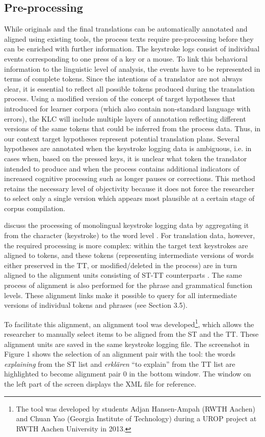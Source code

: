 \documentclass[output=paper]{LSP/langsci}
\begin{document}
\subsection{Pre-processing}
While originals and the final translations can be automatically annotated and aligned using existing tools, the process texts require pre-processing before they can be enriched with further information. The keystroke logs consist of individual events corresponding to one press of a key or a mouse. To link this behavioral information to the linguistic level of analysis, the events have to be represented in terms of complete tokens. Since the intentions of a translator are not always clear, it is essential to reflect all possible tokens produced during the translation process. Using a modified version of the concept of target hypotheses that \citet{Lüdeling2008} introduced for learner corpora (which also contain non-standard language with errors), the KLC will include multiple layers of annotation reflecting different versions of the same tokens that could be inferred from the process data. Thus, in our context target hypotheses represent potential translation plans. Several hypotheses are annotated when the keystroke logging data is ambiguous, i.e. in cases when, based on the pressed keys, it is unclear what token the translator intended to produce and when the process contains additional indicators of increased cognitive processing such as longer pauses or corrections. This method retains the necessary level of objectivity because it does not force the researcher to select only a single version which appears most plausible at a certain stage of corpus compilation.

\citet{Leijten2012} discuss the processing of monolingual keystroke logging data by aggregating it from the character (keystroke) to the word level \citep[see also][]{Macken2012}. For translation data, however, the required processing is more complex: within the target text keystrokes are aligned to tokens, and these tokens (representing intermediate versions of words either preserved in the TT, or modified/deleted in the process) are in turn aligned to the alignment units consisting of ST-TT counterparts \citep[see][227]{Carl2009a}. The same process of alignment is also performed for the phrase and grammatical function levels. These alignment links make it possible to query for all intermediate versions of individual tokens and phrases (see Section 3.5).

To facilitate this alignment, an alignment tool was developed\footnote{The tool was developed by students Adjan Hansen-Ampah (RWTH Aachen) and Chuan Yao (Georgia Institute of Technology) during a UROP project at RWTH Aachen University in 2013.}, which allows the researcher to manually select items to be aligned from the ST and the TT. These alignment units are saved in the same keystroke logging file. The screenshot in Figure 1 shows the selection of an alignment pair with the tool: the words \textit{explaining }from the ST list and \textit{erklären} “to explain” from the TT list are highlighted to become alignment pair 0 in the bottom window. The window on the left part of the screen displays the XML file for reference.
\end{document}
